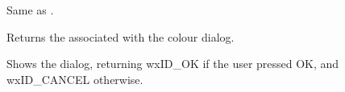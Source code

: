 
Same as .

\label{wxcolourdialoggetcolourdata}


Returns the  associated with the colour dialog.

\label{wxcolourdialogshowmodal}


Shows the dialog, returning wxID\_OK if the user pressed OK, and wxID\_CANCEL
otherwise.


